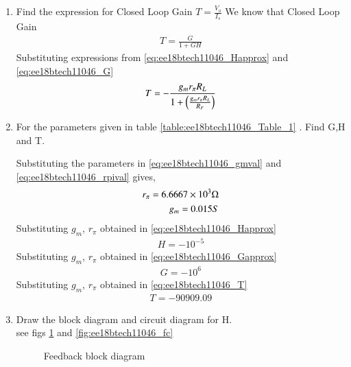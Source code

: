 \begin{enumerate}[label=\thesection.\arabic*.,ref=\thesection.\theenumi]
%
\item Find the expression for Closed Loop Gain $T = \frac{V_{o}}{I_{s}}$
%
We know that Closed Loop Gain
\begin{align}
T = \frac{G}{1+GH}
\end{align}
Substituting expressions from \eqref{eq:ee18btech11046_Happrox} and \eqref{eq:ee18btech11046_G}
\begin{align}
T = -\frac{g_{m}r_{\pi}R_{L}}{1+\left(\frac{g_{m}r_{\pi}R_{L}}{R_{F}}\right)}
\label{eq:ee18btech11046_T}
\end{align}
%

\item For the parameters given in table \ref{table:ee18btech11046_Table_1} . Find G,H and T.
%
\begin{table}[!ht]
\centering

\caption{}
\label{table:ee18btech11046_Table_1}
\end{table}
%
\solution
Substituting the parameters in \eqref{eq:ee18btech11046_gmval} and \eqref{eq:ee18btech11046_rpival} gives,
\begin{align}
r_{\pi} = 6.6667\times 10^{3} \ohm
\\
g_{m} = 0.015 S 
\end{align}
Substituting $g_{m}$, $r_{\pi}$ obtained in 
\eqref{eq:ee18btech11046_Happrox}
\begin{align}
H = -10^{-5}
\end{align}
Substituting $g_{m}$, $r_{\pi}$ obtained in 
\eqref{eq:ee18btech11046_Gapprox}
\begin{align}
G = -10^{6}
\end{align}
Substituting $g_{m}$, $r_{\pi}$ obtained in 
\eqref{eq:ee18btech11046_T}
\begin{align}
T = -90909.09
\end{align}

\item Draw the block diagram and circuit diagram for H.
\\
\solution see figs \ref{fig:ee18btech11046_Hblock}  and \ref{fig:ee18btech11046_fc}
%
\renewcommand{\thefigure}{\theenumi.\arabic{figure}}

\begin{figure}[ht!]
	\begin{center}
		\resizebox{\columnwidth}{!}{}
	\end{center}
	\caption{Feedback block diagram}
	\label{fig:ee18btech11046_Hblock}
\end{figure}


\end{enumerate}
